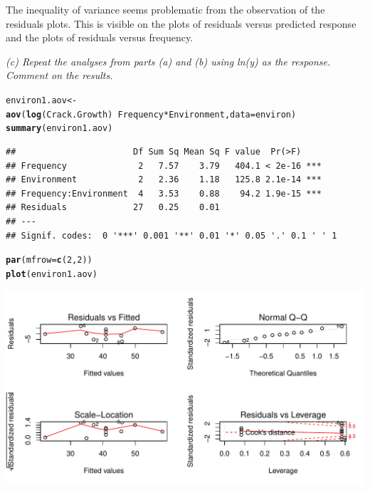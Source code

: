 \documentclass[a4paper]{article}\usepackage{graphicx, color}
\makeatletter
\def\maxwidth{ %
  \ifdim\Gin@nat@width>\linewidth
    \linewidth
  \else
    \Gin@nat@width
  \fi
}
\newcommand{\hlfunctioncall}[1]{\textcolor[rgb]{0.501960784313725,0,0.329411764705882}{\textbf{#1}}}%
\newenvironment{kframe}{%
 \def\at@end@of@kframe{}%
 \ifinner\ifhmode%
  \def\at@end@of@kframe{\end{minipage}}%
  \begin{minipage}{\columnwidth}%
 \fi\fi%
 \def\FrameCommand##1{\hskip\@totalleftmargin \hskip-\fboxsep
 \colorbox{shadecolor}{##1}\hskip-\fboxsep
     \hskip-\linewidth \hskip-\@totalleftmargin \hskip\columnwidth}%
 \MakeFramed {\advance\hsize-\width
   \@totalleftmargin\z@ \linewidth\hsize
   \@setminipage}}%
 {\par\unskip\endMakeFramed%
 \at@end@of@kframe}
\newenvironment{knitrout}{}{} %
\makeatother
\begin{document}
The inequality of variance seems problematic from the observation of the residuals plots. This is visible on the plots of residuals versus predicted response and the plots of residuals versus frequency.\\

\vspace{2 mm}

\textit{(c) Repeat the analyses from parts (a) and (b) using ln(y) as the response. Comment on the results.}\\

\begin{knitrout}
\color{fgcolor}\begin{kframe}
\begin{alltt}
environ1.aov <- \hlfunctioncall{aov}(\hlfunctioncall{log}(Crack.Growth) ~ Frequency * Environment, data = environ)
\hlfunctioncall{summary}(environ1.aov)
\end{alltt}
\begin{verbatim}
##                       Df Sum Sq Mean Sq F value  Pr(>F)    
## Frequency              2   7.57    3.79   404.1 < 2e-16 ***
## Environment            2   2.36    1.18   125.8 2.1e-14 ***
## Frequency:Environment  4   3.53    0.88    94.2 1.9e-15 ***
## Residuals             27   0.25    0.01                    
## ---
## Signif. codes:  0 '***' 0.001 '**' 0.01 '*' 0.05 '.' 0.1 ' ' 1
\end{verbatim}
\begin{alltt}
\hlfunctioncall{par}(mfrow = \hlfunctioncall{c}(2, 2))
\hlfunctioncall{plot}(environ1.aov)
\end{alltt}
\end{kframe}
\includegraphics[width=\maxwidth]{figure/unnamed-chunk-13} 

\end{knitrout}
\end{document}
